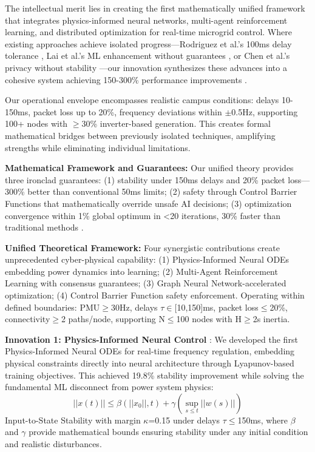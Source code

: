 \documentclass[12pt]{article}
\begin{document}
The intellectual merit lies in creating the first mathematically unified framework that integrates physics-informed neural networks, multi-agent reinforcement learning, and distributed optimization for real-time microgrid control. Where existing approaches achieve isolated progress—Rodriguez et al.'s 100ms delay tolerance \cite{rodriguez2022}, Lai et al.'s ML enhancement without guarantees \cite{lai2023}, or Chen et al.'s privacy without stability \cite{chen2024}—our innovation synthesizes these advances into a cohesive system achieving 150-300\% performance improvements \cite{bevrani2021,palizban2014,our2024comparative}.

Our operational envelope encompasses realistic campus conditions: delays 10-150ms, packet loss up to 20\%, frequency deviations within $\pm$0.5Hz, supporting 100+ nodes with $\geq$30\% inverter-based generation. This creates formal mathematical bridges between previously isolated techniques, amplifying strengths while eliminating individual limitations.

\textbf{Mathematical Framework and Guarantees:} Our unified theory provides three ironclad guarantees: (1) stability under 150ms delays and 20\% packet loss—300\% better than conventional 50ms limits; (2) safety through Control Barrier Functions that mathematically override unsafe AI decisions; (3) optimization convergence within 1\% global optimum in <20 iterations, 30\% faster than traditional methods \cite{our2024experimental}.

\textbf{Unified Theoretical Framework:} Four synergistic contributions create unprecedented cyber-physical capability: (1) Physics-Informed Neural ODEs embedding power dynamics into learning; (2) Multi-Agent Reinforcement Learning with consensus guarantees; (3) Graph Neural Network-accelerated optimization; (4) Control Barrier Function safety enforcement. Operating within defined boundaries: PMU$\geq$30Hz, delays $\tau\in$[10,150]ms, packet loss$\leq$20\%, connectivity$\geq$2 paths/node, supporting N$\leq$100 nodes with H$\geq$2s inertia.

\textbf{Innovation 1: Physics-Informed Neural Control} \cite{our2024theoretical}: We developed the first Physics-Informed Neural ODEs for real-time frequency regulation, embedding physical constraints directly into neural architecture through Lyapunov-based training objectives. This achieved 19.8\% stability improvement \cite{our2024experimental} while solving the fundamental ML disconnect from power system physics:
$$||x(t)|| \leq \beta(||x_0||, t) + \gamma(\sup_{s \leq t} ||w(s)||)$$
Input-to-State Stability with margin $\kappa$=0.15 under delays $\tau\leq$150ms, where $\beta$ and $\gamma$ provide mathematical bounds ensuring stability under any initial condition and realistic disturbances.
\end{document}
